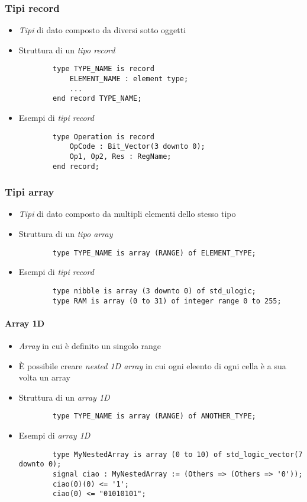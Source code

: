 \documentclass{article}
\begin{document}
\subsubsection{Tipi record}
\begin{itemize}
	\item \textit{Tipi} di dato composto da diversi sotto oggetti
	\item Struttura di un \textit{tipo record}
	      \begin{verbatim}
	    type TYPE_NAME is record
		    ELEMENT_NAME : element type;
		    ...
	    end record TYPE_NAME;
	      \end{verbatim}
	\item Esempi di \textit{tipi record}
	      \begin{verbatim}
	    type Operation is record
		    OpCode : Bit_Vector(3 downto 0);
		    Op1, Op2, Res : RegName;
	    end record;
	      \end{verbatim}
\end{itemize}

\subsubsection{Tipi array}
\begin{itemize}
	\item \textit{Tipi} di dato composto da multipli elementi dello stesso tipo
	\item Struttura di un \textit{tipo array}
	      \begin{verbatim}
	    type TYPE_NAME is array (RANGE) of ELEMENT_TYPE;
	      \end{verbatim}
	\item Esempi di \textit{tipi record}
	      \begin{verbatim}
	    type nibble is array (3 downto 0) of std_ulogic;
	    type RAM is array (0 to 31) of integer range 0 to 255;
	      \end{verbatim}
\end{itemize}

\paragraph{Array 1D}
\begin{itemize}
	\item \textit{Array} in cui è definito un singolo range
	\item \`E possibile creare \textit{nested 1D array} in cui ogni eleento di ogni cella è a sua volta un array
	\item Struttura di un \textit{array 1D}
	\begin{verbatim}
	    type TYPE_NAME is array (RANGE) of ANOTHER_TYPE;
	\end{verbatim}
	\item Esempi di \textit{array 1D}
	\begin{verbatim}
	    type MyNestedArray is array (0 to 10) of std_logic_vector(7 downto 0);
	    signal ciao : MyNestedArray := (Others => (Others => '0'));
	    ciao(0)(0) <= '1';
	    ciao(0) <= "01010101";
	\end{verbatim}
\end{itemize}
\end{document}
